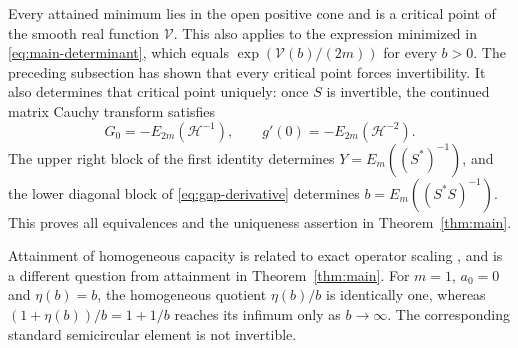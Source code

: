 Every attained minimum lies in the open positive cone and is a critical point of the smooth real function $\mathcal V$.
This also applies to the expression minimized in \eqref{eq:main-determinant}, which equals $\exp(\mathcal V(b)/(2m))$ for every $b>0$.
The preceding subsection has shown that every critical point forces invertibility.
It also determines that critical point uniquely: once $S$ is invertible, the continued matrix Cauchy transform satisfies
\[
 G_0=-E_{2m}(\mathscr H^{-1}),\qquad
 g'(0)=-E_{2m}(\mathscr H^{-2}).
\]
The upper right block of the first identity determines $Y=E_m((S^*)^{-1})$, and the lower diagonal block of \eqref{eq:gap-derivative} determines $b=E_m((S^*S)^{-1})$.
This proves all equivalences and the uniqueness assertion in Theorem~\ref{thm:main}.

\begin{remark}\label{rem:capacity-attainment}
Attainment of homogeneous capacity is related to exact operator scaling \cite[Theorem 4.7]{Gur04}, and is a different question from attainment in Theorem~\ref{thm:main}.
For $m=1$, $a_0=0$ and $\eta(b)=b$, the homogeneous quotient $\eta(b)/b$ is identically one, whereas $(1+\eta(b))/b=1+1/b$ reaches its infimum only as $b\to\infty$.
The corresponding standard semicircular element is not invertible.
\end{remark}
